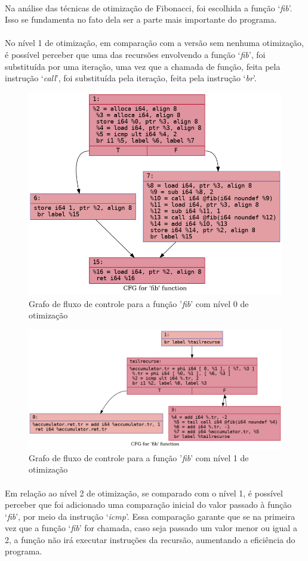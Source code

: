 \documentclass[12pt]{article}
\begin{document}
\paragraph{}Na análise das técnicas de otimização de Fibonacci, foi escolhida a função ‘\textit{fib}’. Isso se fundamenta no fato dela ser a parte mais importante do programa.

\paragraph{}No nível 1 de otimização, em comparação com a versão sem nenhuma otimização, é possível perceber que uma das recursões envolvendo a função ‘\textit{fib}’, foi substituída por uma iteração, uma vez que a chamada de função, feita pela instrução ‘\textit{call}’, foi substituída pela iteração, feita pela instrução ‘\textit{br}’.

\begin{figure}
    \centering
    \includegraphics[width=0.5\linewidth]{fib2_.fib_O0.png}
    \caption{Grafo de fluxo de controle para a função '\textit{fib}' com nível 0 de otimização}
\end{figure}

\begin{figure}
    \centering
    \includegraphics[width=0.5\linewidth]{fib2_.fib_O1.png}
    \caption{Grafo de fluxo de controle para a função '\textit{fib}' com nível 1 de otimização}
\end{figure}

\paragraph{}Em relação ao nível 2 de otimização, se comparado com o nível 1, é possível perceber que foi adicionado uma comparação inicial do valor passado à função ‘\textit{fib}’, por meio da instrução ‘\textit{icmp}’. Essa comparação garante que se na primeira vez que a função ‘\textit{fib}’ for chamada, caso seja passado um valor menor ou igual a 2, a função não irá executar instruções da recursão, aumentando a eficiência do programa.
\end{document}
